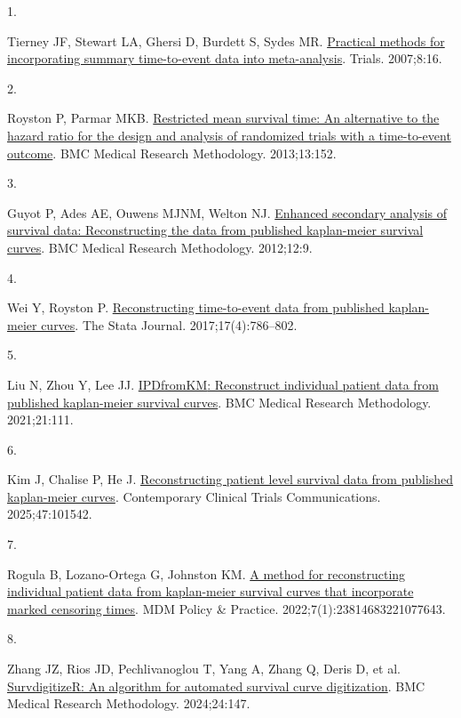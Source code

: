 \documentclass[
  english,
  letterpaper,
  DIV=11,
  numbers=noendperiod]{scrartcl}
\newlength{\cslhangindent}
\newlength{\csllabelwidth}
\newenvironment{CSLReferences}[2] %
 {\begin{list}{}{%
  \setlength{\itemindent}{0pt}
  \setlength{\leftmargin}{0pt}
  \setlength{\parsep}{0pt}
  \ifodd #1
   \setlength{\leftmargin}{\cslhangindent}
   \setlength{\itemindent}{-1\cslhangindent}
  \fi
  \setlength{\itemsep}{#2\baselineskip}}}
 {\end{list}}
\newcommand{\CSLLeftMargin}[1]{\parbox[t]{\csllabelwidth}{\strut#1\strut}}
\newcommand{\CSLRightInline}[1]{\parbox[t]{\linewidth - \csllabelwidth}{\strut#1\strut}}
\begin{document}
\label{refs}
\begin{CSLReferences}{0}{1}
\CSLLeftMargin{1. }%
\CSLRightInline{Tierney JF, Stewart LA, Ghersi D, Burdett S, Sydes MR.
\href{https://doi.org/10.1186/1745-6215-8-16}{Practical methods for
incorporating summary time-to-event data into meta-analysis}. Trials.
2007;8:16. }

\CSLLeftMargin{2. }%
\CSLRightInline{Royston P, Parmar MKB.
\href{https://doi.org/10.1186/1471-2288-13-152}{Restricted mean survival
time: An alternative to the hazard ratio for the design and analysis of
randomized trials with a time-to-event outcome}. BMC Medical Research
Methodology. 2013;13:152. }

\CSLLeftMargin{3. }%
\CSLRightInline{Guyot P, Ades AE, Ouwens MJNM, Welton NJ.
\href{https://doi.org/10.1186/1471-2288-12-9}{Enhanced secondary
analysis of survival data: Reconstructing the data from published
kaplan-meier survival curves}. BMC Medical Research Methodology.
2012;12:9. }

\CSLLeftMargin{4. }%
\CSLRightInline{Wei Y, Royston P.
\href{https://doi.org/10.1177/1536867X1801700402}{Reconstructing
time-to-event data from published kaplan-meier curves}. The Stata
Journal. 2017;17(4):786--802. }

\CSLLeftMargin{5. }%
\CSLRightInline{Liu N, Zhou Y, Lee JJ.
\href{https://doi.org/10.1186/s12874-021-01308-8}{{IPDfromKM}:
Reconstruct individual patient data from published kaplan-meier survival
curves}. BMC Medical Research Methodology. 2021;21:111. }

\CSLLeftMargin{6. }%
\CSLRightInline{Kim J, Chalise P, He J.
\href{https://doi.org/10.1016/j.conctc.2025.101542}{Reconstructing
patient level survival data from published kaplan-meier curves}.
Contemporary Clinical Trials Communications. 2025;47:101542. }

\CSLLeftMargin{7. }%
\CSLRightInline{Rogula B, Lozano-Ortega G, Johnston KM.
\href{https://doi.org/10.1177/23814683221077643}{A method for
reconstructing individual patient data from kaplan-meier survival curves
that incorporate marked censoring times}. MDM Policy \& Practice.
2022;7(1):23814683221077643. }

\CSLLeftMargin{8. }%
\CSLRightInline{Zhang JZ, Rios JD, Pechlivanoglou T, Yang A, Zhang Q,
Deris D, et al.
\href{https://doi.org/10.1186/s12874-024-02273-8}{{SurvdigitizeR}: An
algorithm for automated survival curve digitization}. BMC Medical
Research Methodology. 2024;24:147. }


\end{CSLReferences}
\end{document}
